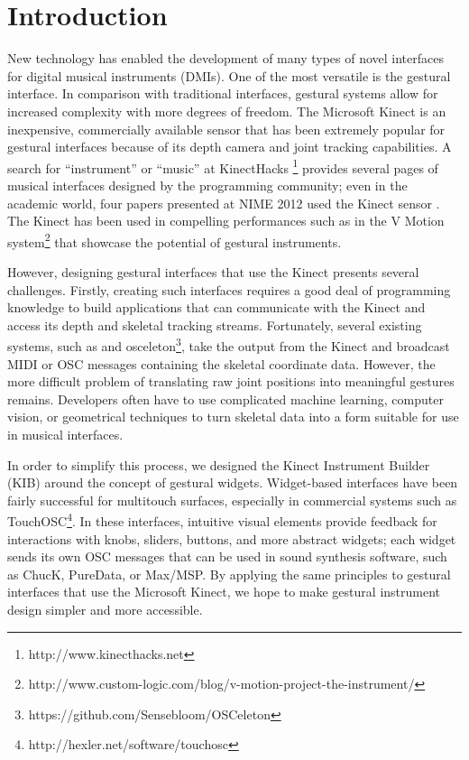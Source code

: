 \documentclass{nime-alternate}
\begin{document}

\section{Introduction}
New technology has enabled the development of many types of novel interfaces for digital
musical instruments (DMIs). One of the most versatile is the gestural interface. In comparison
with traditional interfaces, gestural systems allow for increased complexity with more degrees
of freedom. The Microsoft Kinect is an inexpensive, commercially available sensor that has been
extremely popular for gestural interfaces because of its depth camera and joint tracking
capabilities. A search for ``instrument'' or ``music'' at KinectHacks
\footnote{http://www.kinecthacks.net} provides
several pages of musical interfaces designed by the programming community; even in the
academic world, four papers presented at NIME 2012 used the Kinect sensor \cite{nimekinect1, nimekinect2, nimekinect3, digito}. The Kinect has been used in compelling performances
such as in the V Motion system\footnote{http://www.custom-logic.com/blog/v-motion-project-the-instrument/} that showcase the potential of gestural instruments.

However, designing gestural interfaces that use the Kinect presents several challenges. 
Firstly, creating such interfaces requires a good deal of programming knowledge to build
applications that can communicate with the Kinect and access its depth and skeletal tracking streams. 
Fortunately, several existing systems, such as \cite{yoo2011creating} and osceleton\footnote{https://github.com/Sensebloom/OSCeleton}, take the output from
the Kinect and broadcast MIDI or OSC messages containing the skeletal coordinate data. However,
the more difficult problem of translating raw joint positions into meaningful gestures remains.
Developers often have to use complicated machine learning, computer vision, or geometrical
techniques to turn skeletal data into a form suitable for use in musical interfaces. 

In order to simplify this process, we designed the Kinect Instrument Builder (KIB) around the
concept of gestural widgets. Widget-based interfaces have been fairly successful for multitouch
surfaces, especially in commercial systems such as TouchOSC\footnote{http://hexler.net/software/touchosc}. In these interfaces, intuitive visual elements provide feedback for interactions
with knobs, sliders, buttons, and more abstract widgets; each widget sends its own OSC messages
that can be used in sound synthesis software, such as ChucK, PureData, or Max/MSP. By applying
the same principles to gestural interfaces that use the Microsoft Kinect, we hope to make gestural
instrument design simpler and more accessible. 
\end{document}
